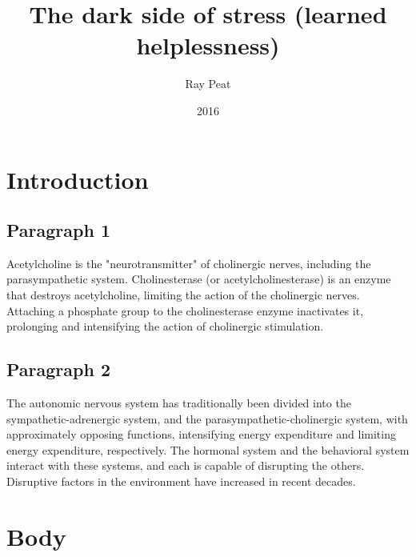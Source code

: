 \documentclass{article}
\title{The dark side of stress (learned helplessness) }
\author{Ray Peat}
\date{2016}
\begin{document}
\maketitle


\section{Introduction}
\subsection{Paragraph 1}
Acetylcholine is the "neurotransmitter" of cholinergic nerves, including the parasympathetic system.
Cholinesterase (or acetylcholinesterase) is an enzyme that destroys acetylcholine, limiting the action of the cholinergic nerves.
Attaching a phosphate group to the cholinesterase enzyme inactivates it, prolonging and intensifying the action of cholinergic stimulation.

\subsection{Paragraph 2}
The autonomic nervous system has traditionally been divided into the sympathetic-adrenergic system, and the parasympathetic-cholinergic system, with approximately opposing functions, intensifying energy expenditure and limiting energy expenditure, respectively. The hormonal system and the behavioral system interact with these systems, and each is capable of disrupting the others. Disruptive factors in the environment have increased in recent decades.

\section{Body}
\end{document}
